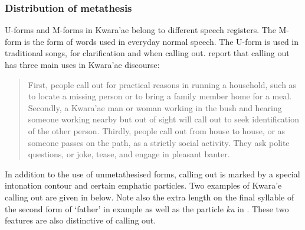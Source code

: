 \subsubsection{Distribution of metathesis}\label{sec:KwaFun}
U-forms and M-forms in Kwara'ae belong to different speech registers.
The M-form is the form of words used in everyday normal speech.
The U-form is used in traditional songs,
for clarification \citep[3]{he04} and when calling out.
\citet[19]{wage86} report that calling out has three main uses in Kwara'ae discourse:

\begin{quote}
First, people call out for practical reasons in running a household,
such as to locate a missing person or to bring a family member home for a meal.
Secondly, a Kwara'ae man or woman working in the bush and hearing someone
working nearby but out of sight will call out to seek identification of the other person.
Thirdly, people call out from house to house, or as someone passes on the path, as a strictly social activity.
They ask polite questions, or joke, tease, and engage in pleasant banter. \hfill\citep{wage86}
\end{quote}

In addition to the use of unmetathesised forms, calling out is marked
by a special intonation contour and certain emphatic particles.
Two examples of Kwara'e calling out are given in  below.
Note also the extra length on the final syllable of the second form of `father' in example
 as well as the particle \emph{ku} in .
These two features are also distinctive of calling out.

\begin{exe}\let\eachwordone=\it
	\label{KwCallingOut}
		\begin{xlist}
		\end{xlist}
\end{exe}

